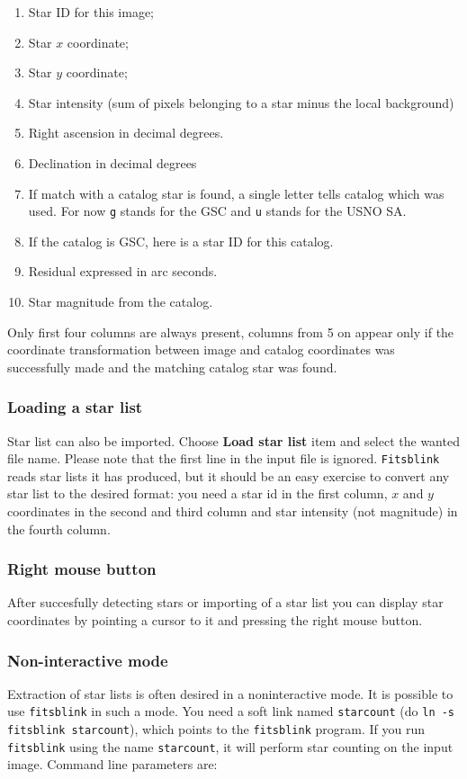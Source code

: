 \documentclass[11pt]{article}
\begin{document}
\begin{enumerate}
\item Star ID for this image;
\item Star $x$ coordinate;
\item Star $y$ coordinate;
\item Star intensity (sum of pixels belonging to a star minus the
local background)
\item Right ascension in decimal degrees.
\item Declination in decimal degrees
\item If match with a catalog star is found, a single letter tells
catalog which was used.  For now \verb=g= stands for the GSC and
\verb=u= stands for the USNO SA.
\item If the catalog is GSC, here is a star ID for this catalog.
\item Residual expressed in arc seconds.
\item Star magnitude from the catalog.
\end{enumerate}

Only first four columns are always present, columns from 5 on appear
only if the coordinate transformation between image and catalog
coordinates was successfully made and the matching catalog star was
found.

\subsubsection{Loading a star list}

Star list can also be imported.  Choose \textbf{Load star list} item
and select the wanted file name.  Please note that the first line in
the input file is ignored. \verb=Fitsblink= reads star lists it has
produced, but it should be an easy exercise to convert any star list
to the desired format: you need a star id in the first column, $x$ and
$y$ coordinates in the second and third column and star intensity (not
magnitude) in the fourth column.

\subsubsection{Right mouse button}

After succesfully detecting stars or importing of a star list you can
display star coordinates by pointing a cursor to it and pressing the
right mouse button.


\subsubsection{Non-interactive mode}
\label{starcount}
Extraction of star lists is often desired in a noninteractive mode.
It is possible to use \verb=fitsblink= in such a mode.  You need a
soft link named \verb=starcount= (do \verb=ln -s fitsblink starcount=), 
which points to the \verb=fitsblink= program.  If you run
\verb=fitsblink= using the name \verb=starcount=, it will perform star
counting on the input image.  Command line parameters are:
\end{document}

